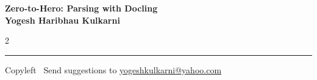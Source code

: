 \documentclass[8pt,landscape]{article}
\begin{document}
\footnotesize


\begin{center}
\Large{\textbf{Zero-to-Hero: Parsing with Docling\\ Yogesh Haribhau Kulkarni}}
\end{center}

\begin{multicols}{2}

\end{multicols}

\rule{\linewidth}{0.25pt}
\scriptsize
Copyleft \textcopyleft\  Send suggestions to
\href{http://www.yogeshkulkarni.com}{yogeshkulkarni@yahoo.com}
\end{document}

